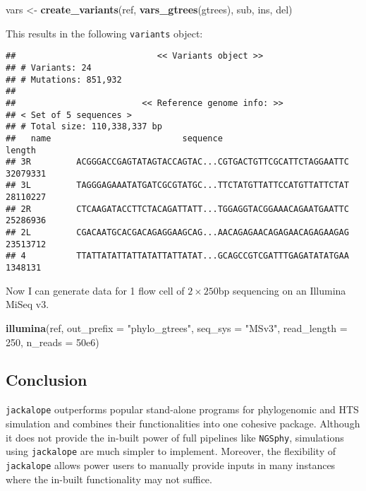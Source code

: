 \documentclass[12pt,]{article}
\newenvironment{Shaded}{\begin{snugshade}}{\end{snugshade}}
\newcommand{\DataTypeTok}[1]{\textcolor[rgb]{0.13,0.29,0.53}{#1}}
\newcommand{\DecValTok}[1]{\textcolor[rgb]{0.00,0.00,0.81}{#1}}
\newcommand{\FloatTok}[1]{\textcolor[rgb]{0.00,0.00,0.81}{#1}}
\newcommand{\KeywordTok}[1]{\textcolor[rgb]{0.13,0.29,0.53}{\textbf{#1}}}
\newcommand{\NormalTok}[1]{#1}
\newcommand{\StringTok}[1]{\textcolor[rgb]{0.31,0.60,0.02}{#1}}
\begin{document}
\begin{Shaded}
\begin{Highlighting}[]
\NormalTok{vars <-}\StringTok{ }\KeywordTok{create_variants}\NormalTok{(ref, }\KeywordTok{vars_gtrees}\NormalTok{(gtrees),}
\NormalTok{                        sub, ins, del)}
\end{Highlighting}
\end{Shaded}

This results in the following \texttt{variants} object:

\begin{verbatim}
##                            << Variants object >>
## # Variants: 24
## # Mutations: 851,932
## 
##                         << Reference genome info: >>
## < Set of 5 sequences >
## # Total size: 110,338,337 bp
##   name                          sequence                             length
## 3R         ACGGGACCGAGTATAGTACCAGTAC...CGTGACTGTTCGCATTCTAGGAATTC  32079331
## 3L         TAGGGAGAAATATGATCGCGTATGC...TTCTATGTTATTCCATGTTATTCTAT  28110227
## 2R         CTCAAGATACCTTCTACAGATTATT...TGGAGGTACGGAAACAGAATGAATTC  25286936
## 2L         CGACAATGCACGACAGAGGAAGCAG...AACAGAGAACAGAGAACAGAGAAGAG  23513712
## 4          TTATTATATTATTATATTATTATAT...GCAGCCGTCGATTTGAGATATATGAA   1348131
\end{verbatim}

Now I can generate data for 1 flow cell of \(2 \times 250\)bp sequencing
on an Illumina MiSeq v3.

\begin{Shaded}
\begin{Highlighting}[]
\KeywordTok{illumina}\NormalTok{(ref, }\DataTypeTok{out_prefix =} \StringTok{"phylo_gtrees"}\NormalTok{,}
         \DataTypeTok{seq_sys =} \StringTok{"MSv3"}\NormalTok{,}
         \DataTypeTok{read_length =} \DecValTok{250}\NormalTok{,}
         \DataTypeTok{n_reads =} \FloatTok{50e6}\NormalTok{)}
\end{Highlighting}
\end{Shaded}

\hypertarget{conclusion}{%
\subsection{Conclusion}\label{conclusion}}

\texttt{jackalope} outperforms popular stand-alone programs for phylogenomic and HTS
simulation and combines their functionalities into one cohesive package.
Although it does not provide the in-built power of full pipelines like \texttt{NGSphy},
simulations using \texttt{jackalope} are much simpler to implement.
Moreover, the flexibility of \texttt{jackalope} allows power users to manually
provide inputs in many instances where the in-built functionality may not suffice.
\end{document}
